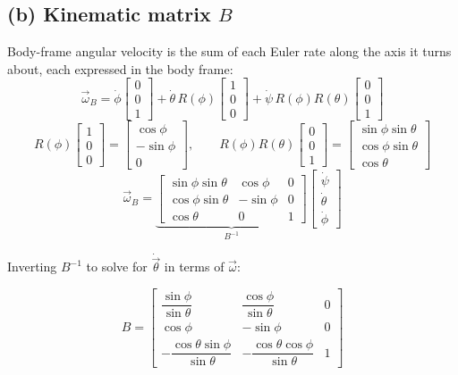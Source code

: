 \documentclass[11pt]{article}
\begin{document}
\subsection*{(b) Kinematic matrix $B$}

Body-frame angular velocity is the sum of each Euler rate along the axis it turns about, each expressed in the body frame:
\[
\vec\omega_B=\dot\phi\begin{bmatrix}0\\0\\1\end{bmatrix}+\dot\theta\,R(\phi)\begin{bmatrix}1\\0\\0\end{bmatrix}+\dot\psi\,R(\phi)R(\theta)\begin{bmatrix}0\\0\\1\end{bmatrix}
\]
\[
R(\phi)\begin{bmatrix}1\\0\\0\end{bmatrix}=\begin{bmatrix}\cos\phi\\-\sin\phi\\0\end{bmatrix}, \qquad
R(\phi)R(\theta)\begin{bmatrix}0\\0\\1\end{bmatrix}=\begin{bmatrix}\sin\phi\sin\theta\\\cos\phi\sin\theta\\\cos\theta\end{bmatrix}
\]
\[
\vec\omega_B=\underbrace{\begin{bmatrix}\sin\phi\sin\theta&\cos\phi&0\\\cos\phi\sin\theta&-\sin\phi&0\\\cos\theta&0&1\end{bmatrix}}_{B^{-1}}\begin{bmatrix}\dot\psi\\\dot\theta\\\dot\phi\end{bmatrix}
\]

Inverting $B^{-1}$ to solve for $\dot{\vec\theta}$ in terms of $\vec\omega$:

\begin{result}
\[
B=\begin{bmatrix}
\dfrac{\sin\phi}{\sin\theta} & \dfrac{\cos\phi}{\sin\theta} & 0\\[8pt]
\cos\phi & -\sin\phi & 0\\[8pt]
-\dfrac{\cos\theta\sin\phi}{\sin\theta} & -\dfrac{\cos\theta\cos\phi}{\sin\theta} & 1
\end{bmatrix}
\]
\end{result}
\end{document}
